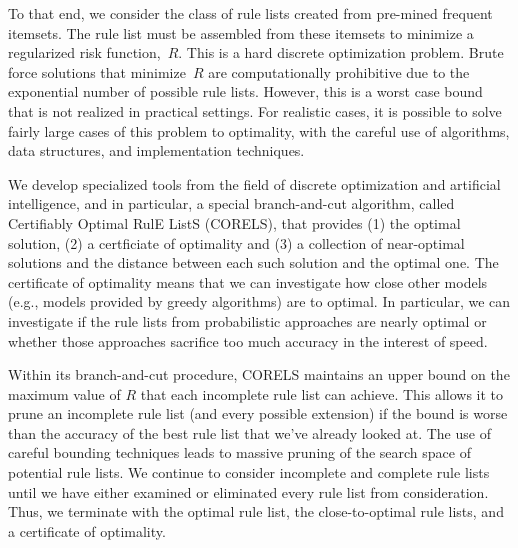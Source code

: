 To that end, we consider the class of rule lists created from pre-mined frequent itemsets.
%
The rule list must be assembled from these itemsets to minimize a regularized risk function,~$R$.
%
This is a hard discrete optimization problem.
%
Brute force solutions that minimize~$R$ are computationally prohibitive
due to the exponential number of possible rule lists.
%
However, this is a worst case bound that is not realized in practical settings.
%
For realistic cases, it is possible to solve fairly large cases of this problem to optimality,
with the careful use of algorithms, data structures, and implementation techniques.

We develop specialized tools from the field of discrete optimization and artificial intelligence, and in particular, a special branch-and-cut algorithm, called  Certifiably Optimal RulE ListS (CORELS), that provides (1) the optimal solution, (2) a certficiate of optimality and (3) a collection of near-optimal solutions and the distance between each such solution and the optimal one. The certificate of optimality means that we can investigate how close other models (e.g., models provided by greedy algorithms) are to optimal. In particular, we can investigate if the rule lists from probabilistic approaches are nearly optimal or whether those approaches sacrifice too much accuracy in the interest of speed.

\begin{arxiv}
Within its branch-and-cut procedure, CORELS maintains an upper bound on the maximum value of $R$ that each incomplete rule list can achieve. This allows it to prune an incomplete rule list (and every possible extension) if the bound is worse than the accuracy of the best rule list that we've already looked at. The use of careful bounding techniques leads to massive pruning of the search space of potential rule lists. We continue to consider incomplete and complete rule lists until we have either examined or eliminated every rule list from consideration. Thus, we terminate with the optimal rule list, the close-to-optimal rule lists, and a certificate of optimality.
\end{arxiv}

